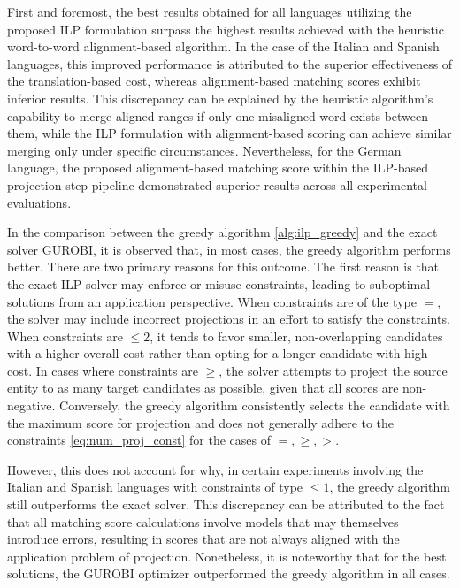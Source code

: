 First and foremost, the best results obtained for all languages utilizing the
proposed ILP formulation surpass the highest results achieved with the heuristic
word-to-word alignment-based algorithm. In the case of the Italian and Spanish languages,
this improved performance is attributed to the superior effectiveness of the
translation-based cost, whereas alignment-based matching scores exhibit inferior results.
This discrepancy can be explained by the heuristic algorithm's capability to merge aligned
ranges if only one misaligned word exists between them, while the ILP formulation with
alignment-based scoring can achieve similar merging only under specific circumstances.
Nevertheless, for the German language, the proposed alignment-based matching score
within the ILP-based projection step pipeline demonstrated superior results across
all experimental evaluations.

In the comparison between the greedy algorithm \ref{alg:ilp_greedy} and the exact solver
GUROBI, it is observed that, in most cases, the greedy algorithm performs better.
There are two primary reasons for this outcome. The first reason is that the exact
ILP solver may enforce or misuse constraints, leading to suboptimal solutions from an
application perspective. When constraints are of the type \( = \), the solver may
include incorrect projections in an effort to satisfy the constraints. When constraints
are \( \leq 2 \), it tends to favor smaller, non-overlapping candidates with a higher
overall cost rather than opting for a longer candidate with high cost. In cases where
constraints are \( \geq \), the solver attempts to project the source entity to as many
target candidates as possible, given that all scores are non-negative.
Conversely, the greedy algorithm consistently selects the candidate with the maximum score
for projection and does not generally adhere to the constraints \eqref{eq:num_proj_const}
for the cases of \( =, \geq, > \).

However, this does not account for why, in certain experiments involving the Italian and
Spanish languages with constraints of type \( \leq 1 \), the greedy algorithm still
outperforms the exact solver. This discrepancy can be attributed to the fact that all
matching score calculations involve models that may themselves introduce errors,
resulting in scores that are not always aligned with the application problem of projection.
Nonetheless, it is noteworthy that for the best solutions, the GUROBI optimizer
outperformed the greedy algorithm in all cases.

